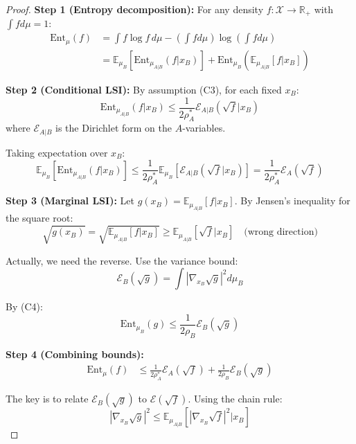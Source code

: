 \begin{proof}
\textbf{Step 1 (Entropy decomposition):}
For any density $f: \mathcal{X} \to \mathbb{R}_+$ with $\int f d\mu = 1$:
\begin{align}
\mathrm{Ent}_\mu(f) &= \int f \log f \, d\mu - \left(\int f d\mu\right) \log\left(\int f d\mu\right) \\
&= \mathbb{E}_{\mu_B}\left[\mathrm{Ent}_{\mu_{A|B}}(f | x_B)\right] + \mathrm{Ent}_{\mu_B}(\mathbb{E}_{\mu_{A|B}}[f | x_B])
\end{align}

\textbf{Step 2 (Conditional LSI):}
By assumption (C3), for each fixed $x_B$:
\begin{equation}
\mathrm{Ent}_{\mu_{A|B}}(f | x_B) \leq \frac{1}{2\rho_A^*} \mathcal{E}_{A|B}(\sqrt{f} | x_B)
\end{equation}
where $\mathcal{E}_{A|B}$ is the Dirichlet form on the $A$-variables.

Taking expectation over $x_B$:
\begin{equation}
\mathbb{E}_{\mu_B}\left[\mathrm{Ent}_{\mu_{A|B}}(f | x_B)\right] \leq \frac{1}{2\rho_A^*} \mathbb{E}_{\mu_B}\left[\mathcal{E}_{A|B}(\sqrt{f} | x_B)\right] = \frac{1}{2\rho_A^*} \mathcal{E}_A(\sqrt{f})
\end{equation}

\textbf{Step 3 (Marginal LSI):}
Let $g(x_B) = \mathbb{E}_{\mu_{A|B}}[f | x_B]$. By Jensen's inequality for the square root:
\begin{equation}
\sqrt{g(x_B)} = \sqrt{\mathbb{E}_{\mu_{A|B}}[f | x_B]} \geq \mathbb{E}_{\mu_{A|B}}[\sqrt{f} | x_B] \quad \text{(wrong direction)}
\end{equation}

Actually, we need the reverse. Use the variance bound:
\begin{equation}
\mathcal{E}_B(\sqrt{g}) = \int |\nabla_{x_B} \sqrt{g}|^2 d\mu_B
\end{equation}

By (C4):
\begin{equation}
\mathrm{Ent}_{\mu_B}(g) \leq \frac{1}{2\rho_B} \mathcal{E}_B(\sqrt{g})
\end{equation}

\textbf{Step 4 (Combining bounds):}
\begin{align}
\mathrm{Ent}_\mu(f) &\leq \frac{1}{2\rho_A^*} \mathcal{E}_A(\sqrt{f}) + \frac{1}{2\rho_B} \mathcal{E}_B(\sqrt{g})
\end{align}

The key is to relate $\mathcal{E}_B(\sqrt{g})$ to $\mathcal{E}(\sqrt{f})$. Using the chain rule:
\begin{equation}
|\nabla_{x_B} \sqrt{g}|^2 \leq \mathbb{E}_{\mu_{A|B}}\left[|\nabla_{x_B} \sqrt{f}|^2 | x_B\right]
\end{equation}


\end{proof}
